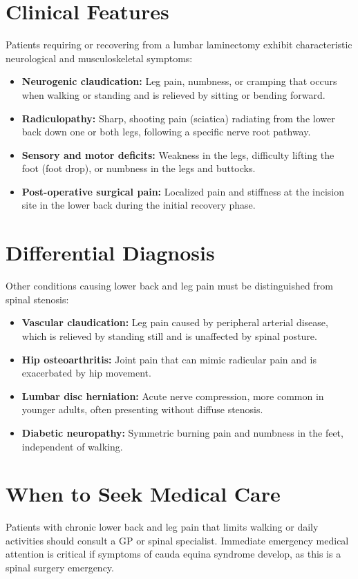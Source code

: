 \section*{Clinical Features}
Patients requiring or recovering from a lumbar laminectomy exhibit characteristic neurological and musculoskeletal symptoms:

\begin{itemize}
    \item \textbf{Neurogenic claudication:} Leg pain, numbness, or cramping that occurs when walking or standing and is relieved by sitting or bending forward.
    \item \textbf{Radiculopathy:} Sharp, shooting pain (sciatica) radiating from the lower back down one or both legs, following a specific nerve root pathway.
    \item \textbf{Sensory and motor deficits:} Weakness in the legs, difficulty lifting the foot (foot drop), or numbness in the legs and buttocks.
    \item \textbf{Post-operative surgical pain:} Localized pain and stiffness at the incision site in the lower back during the initial recovery phase.
\end{itemize}

\section*{Differential Diagnosis}
Other conditions causing lower back and leg pain must be distinguished from spinal stenosis:

\begin{itemize}
    \item \textbf{Vascular claudication:} Leg pain caused by peripheral arterial disease, which is relieved by standing still and is unaffected by spinal posture.
    \item \textbf{Hip osteoarthritis:} Joint pain that can mimic radicular pain and is exacerbated by hip movement.
    \item \textbf{Lumbar disc herniation:} Acute nerve compression, more common in younger adults, often presenting without diffuse stenosis.
    \item \textbf{Diabetic neuropathy:} Symmetric burning pain and numbness in the feet, independent of walking.
\end{itemize}

\section*{When to Seek Medical Care}
Patients with chronic lower back and leg pain that limits walking or daily activities should consult a GP or spinal specialist. Immediate emergency medical attention is critical if symptoms of cauda equina syndrome develop, as this is a spinal surgery emergency.

